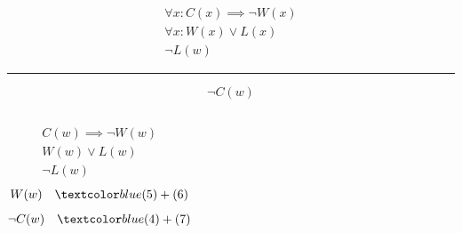 \begin{frame}{}
  \begin{gather}
    \forall x: C(x) \implies \lnot W(x) \\[5pt]
    \forall x: W(x) \lor L(x) \\[5pt]
    \lnot L(w)
  \end{gather}
  
  \hrule
  \[
    \lnot C(w)
  \]

  \pause
  \begin{columns}
      \begin{gather}
	C(w) \implies \lnot W(w) \\[5pt]
	W(w) \lor L(w) \\[5pt]
	\lnot L(w)
      \end{gather}
      \begin{gather}
	W(w) \quad \blue{(5) + (6)} \\[5pt]
	\lnot C(w) \quad \blue{(4) + (7)} 
      \end{gather}
  \end{columns}
\end{frame}


